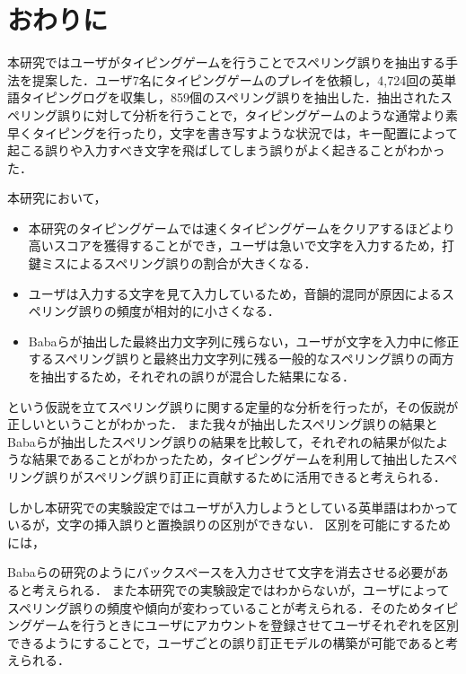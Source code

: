 \chapter{おわりに}
本研究ではユーザがタイピングゲームを行うことでスペリング誤りを抽出する手法を提案した．ユーザ7名にタイピングゲームのプレイを依頼し，4,724回の英単語タイピングログを収集し，859個のスペリング誤りを抽出した．抽出されたスペリング誤りに対して分析を行うことで，タイピングゲームのような通常より素早くタイピングを行ったり，文字を書き写すような状況では，キー配置によって起こる誤りや入力すべき文字を飛ばしてしまう誤りがよく起きることがわかった．

本研究において，

\begin{itemize}
 \item 本研究のタイピングゲームでは速くタイピングゲームをクリアするほどより高いスコアを獲得することができ，ユーザは急いで文字を入力するため，打鍵ミスによるスペリング誤りの割合が大きくなる．
 \item ユーザは入力する文字を見て入力しているため，音韻的混同が原因によるスペリング誤りの頻度が相対的に小さくなる．
 \item Babaらが抽出した最終出力文字列に残らない，ユーザが文字を入力中に修正するスペリング誤り\cite{babaACL2012}と最終出力文字列に残る一般的なスペリング誤りの両方を抽出するため，それぞれの誤りが混合した結果になる．
\end{itemize}

\noindent
という仮説を立てスペリング誤りに関する定量的な分析を行ったが，その仮説が正しいということがわかった．
また我々が抽出したスペリング誤りの結果とBabaらが抽出したスペリング誤りの結果を比較して，それぞれの結果が似たような結果であることがわかったため，タイピングゲームを利用して抽出したスペリング誤りがスペリング誤り訂正に貢献するために活用できると考えられる．

しかし本研究での実験設定ではユーザが入力しようとしている英単語はわかっているが，文字の挿入誤りと置換誤りの区別ができない．
区別を可能にするためには，
\begin{comment}
タイピングゲームにおいて入力した文字列が正しいかどうか判定するときにエンターキーを入力させて英単語に対応する文字列を明確にする，
\end{comment}
Babaらの研究\cite{babaACL2012}のようにバックスペースを入力させて文字を消去させる必要があると考えられる．
また本研究での実験設定ではわからないが，ユーザによってスペリング誤りの頻度や傾向が変わっていることが考えられる．そのためタイピングゲームを行うときにユーザにアカウントを登録させてユーザそれぞれを区別できるようにすることで，ユーザごとの誤り訂正モデルの構築が可能であると考えられる．

